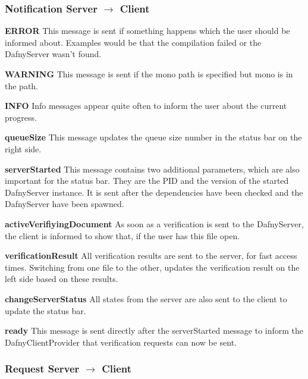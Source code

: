 \subsubsection{Notification Server $\longrightarrow$ Client}

\textbf{ERROR}
This message is sent if something happens which the user should be informed about. Examples would be that the compilation failed or the DafnyServer wasn't found. \newline

\textbf{WARNING}
This message is sent if the mono path is specified but mono is in the path. \newline

\textbf{INFO}
Info messages appear quite often to inform the user about the current progress. \newline

\textbf{queueSize}
This message updates the queue size number in the status bar on the right side. \newline

\textbf{serverStarted}
This message contains two additional parameters, which are also important for the status bar. They are the PID and the version of the started DafnyServer instance. It is sent after the dependencies have been checked and the DafnyServer have been spawned. \newline

\textbf{activeVerifiyingDocument}
As soon as a verification is sent to the DafnyServer, the client is informed to show that, if the user has this file open. \newline

\textbf{verificationResult}
All verification results are sent to the server, for fast access times. Switching from one file to the other, updates the verification result on the left side based on these results. \newline

\textbf{changeServerStatus}
All states from the server are also sent to the client to update the status bar. \newline

\textbf{ready}
This message is sent directly after the serverStarted message to inform the DafnyClientProvider that verification requests can now be sent. \newline

\subsubsection{Request Server $\longrightarrow$ Client}

